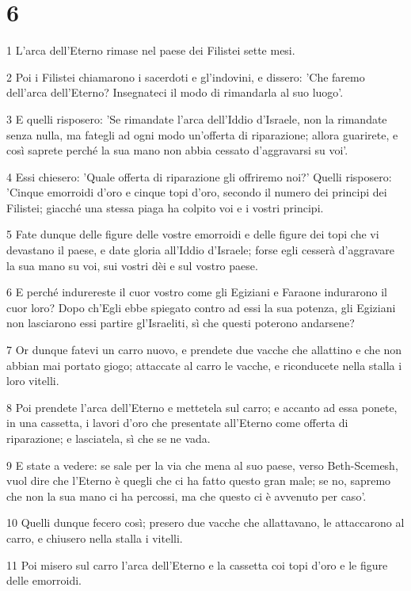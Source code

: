 \chapter{6}

\par 1 L'arca dell'Eterno rimase nel paese dei Filistei sette mesi.
\par 2 Poi i Filistei chiamarono i sacerdoti e gl'indovini, e dissero: 'Che faremo dell'arca dell'Eterno? Insegnateci il modo di rimandarla al suo luogo'.
\par 3 E quelli risposero: 'Se rimandate l'arca dell'Iddio d'Israele, non la rimandate senza nulla, ma fategli ad ogni modo un'offerta di riparazione; allora guarirete, e così saprete perché la sua mano non abbia cessato d'aggravarsi su voi'.
\par 4 Essi chiesero: 'Quale offerta di riparazione gli offriremo noi?' Quelli risposero: 'Cinque emorroidi d'oro e cinque topi d'oro, secondo il numero dei principi dei Filistei; giacché una stessa piaga ha colpito voi e i vostri principi.
\par 5 Fate dunque delle figure delle vostre emorroidi e delle figure dei topi che vi devastano il paese, e date gloria all'Iddio d'Israele; forse egli cesserà d'aggravare la sua mano su voi, sui vostri dèi e sul vostro paese.
\par 6 E perché indurereste il cuor vostro come gli Egiziani e Faraone indurarono il cuor loro? Dopo ch'Egli ebbe spiegato contro ad essi la sua potenza, gli Egiziani non lasciarono essi partire gl'Israeliti, sì che questi poterono andarsene?
\par 7 Or dunque fatevi un carro nuovo, e prendete due vacche che allattino e che non abbian mai portato giogo; attaccate al carro le vacche, e riconducete nella stalla i loro vitelli.
\par 8 Poi prendete l'arca dell'Eterno e mettetela sul carro; e accanto ad essa ponete, in una cassetta, i lavori d'oro che presentate all'Eterno come offerta di riparazione; e lasciatela, sì che se ne vada.
\par 9 E state a vedere: se sale per la via che mena al suo paese, verso Beth-Scemesh, vuol dire che l'Eterno è quegli che ci ha fatto questo gran male; se no, sapremo che non la sua mano ci ha percossi, ma che questo ci è avvenuto per caso'.
\par 10 Quelli dunque fecero così; presero due vacche che allattavano, le attaccarono al carro, e chiusero nella stalla i vitelli.
\par 11 Poi misero sul carro l'arca dell'Eterno e la cassetta coi topi d'oro e le figure delle emorroidi.

